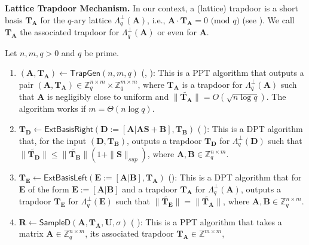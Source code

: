 \documentclass[runningheads,10pt]{llncs}
\begin{document}
\noindent \textbf{Lattice Trapdoor Mechanism.}	In our context, 
a (lattice) trapdoor is a short basis $\textbf{T}_\textbf{A}$ for the  $q$-ary  lattice $\Lambda^{\bot}_q(\textbf{A})$,
i.e., $\textbf{A}\cdot\textbf{T}_\textbf{A}=0 \text{ (mod } q)$ (see \cite{GPV08}). 
We call  $\textbf{T}_\textbf{A}$ the associated trapdoor for $\Lambda^{\bot}_q(\textbf{A})$ or even for $\textbf{A}$. 
\begin{lemma}\label{trapdoor}
	Let $n, m, q>0$ and $q$ be prime. 
	\begin{enumerate}
		\item $(\mathbf{A},\mathbf{T}_\mathbf{A}) \leftarrow \mathsf{TrapGen}(n,m,q)$ (\cite{AP09}, \cite{MP12}): 
		This is a PPT algorithm that  outputs a pair 
		$(\mathbf{A},\mathbf{T}_\mathbf{A}) \in \mathbb{Z}_q^{n \times m}\times \mathbb{Z}_q^{m \times m}$,
		where $\mathbf{T}_\mathbf{A}$ is a trapdoor for $\Lambda^{\bot}_q(\mathbf{A})$
		such that $\mathbf{A}$ is negligibly close to uniform and $\| \widetilde{\mathbf{T}_\mathbf{A}} \|=O(\sqrt{n \log q})$.
		The algorithm works if $m=\Theta(n \log q)$.  
		\item $\mathbf{T}_\mathbf{D}\leftarrow \mathsf{ExtBasisRight}(\mathbf{D}:=[\mathbf{A}|\mathbf{A}\mathbf{S}+\mathbf{B}], \mathbf{T}_\mathbf{B})$ 
		( \cite{ABB10}): This is a DPT algorithm that, 
		for the input $(\mathbf{D}, \mathbf{T}_\mathbf{B})$,
		outputs a trapdoor 
		$\mathbf{T}_\mathbf{D}$ for $\Lambda^{\bot}_q(\mathbf{D})$ 
		such that $\| \widetilde{\mathbf{T}_\mathbf{D}}\| \leq \| \widetilde{\mathbf{T}_\mathbf{B}}\|(1+\|\mathbf{S}\|_{sup})$,
		where $\mathbf{A}, \mathbf{B}  \in \mathbb{Z}_q^{n \times m}$.	
		\item $\mathbf{T}_\mathbf{E}\leftarrow \mathsf{ExtBasisLeft}(\mathbf{E}:=[\mathbf{A}|\mathbf{B}], \mathbf{T}_\mathbf{A})$ (\cite{CHKP10}): 
		This is a DPT algorithm that 
		for $\mathbf{E}$ of the form  $\mathbf{E}:=[\mathbf{A}|\mathbf{B}]$ and a trapdoor $\mathbf{T}_\mathbf{A}$ for $\Lambda^{\bot}_q(\mathbf{A})$, 
		outputs a trapdoor $\mathbf{T}_\mathbf{E}$ for $\Lambda^{\bot}_q(\mathbf{E})$ 
		such that $\| \widetilde{\mathbf{T}_\mathbf{E}}\| =\| \widetilde{\mathbf{T}_\mathbf{A}}\|$, where $\mathbf{A}, \mathbf{B}  \in \mathbb{Z}_q^{n \times m}$. 
		\item $\mathbf{R}\leftarrow\mathsf{SampleD}(\mathbf{A},\mathbf{T}_\mathbf{A}, \mathbf{U}, \sigma)$ ( \cite{GPV08}): 
		This is a PPT algorithm that takes 
		a matrix $\mathbf{A} \in \mathbb{Z}_q^{n \times m}$,  
		its associated  trapdoor $\mathbf{T}_\mathbf{A} \in \mathbb{Z}^{m \times m}$, 

\end{enumerate}
\end{lemma}
\end{document}

